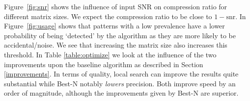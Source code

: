 \documentclass{llncs}
\begin{document}
Figure~\ref{fig:snr} shows the influence of input SNR on compression ratio for different matrix sizes. We expect the compression ratio to be close to $1-\mathrm{snr}$. In Figure~\ref{fig:usage} shows that patterns with a low prevalence have a lower probability of being `detected' by the algorithm as they are more likely to be accidental/noise. We see that increasing the matrix size also increases this threshold. In Table \ref{table:optimize} we look at the influence of the two improvements upon the baseline algorithm as described in Section \ref{improvements}. In terms of quality, local search can improve the results quite substantial while Best-N notably \emph{lowers} precision. Both improve speed by an order of magnitude, although the improvements given by Best-N are superior. %
\end{document}
